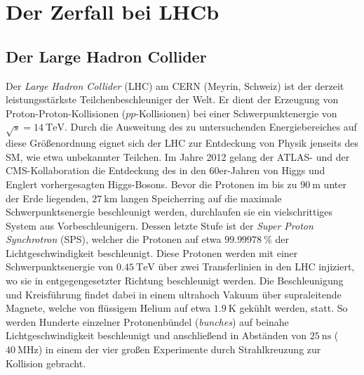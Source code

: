 \chapter{Der Zerfall bei LHCb}
%
\section{Der Large Hadron Collider}
%
Der \textit{Large Hadron Collider} (LHC) am CERN (Meyrin, Schweiz) ist der derzeit leistungsstärkste Teilchenbeschleuniger der Welt. Er dient der Erzeugung von Proton-Proton-Kollisionen ($pp$-Kollisionen) bei einer Schwerpunktenergie von $\sqrt{s}=\SI{14}{\tera\electronvolt}$\cite{lhc}. Durch die Ausweitung des zu untersuchenden Energiebereiches auf diese Größenordnung eignet sich der LHC zur Entdeckung von Physik jenseits des SM, wie etwa unbekannter Teilchen. Im Jahre 2012 gelang der ATLAS- und der CMS-Kollaboration die Entdeckung des in den 60er-Jahren von Higgs und Englert vorhergesagten Higgs-Bosons\cite{higgs}.
Bevor die Protonen im bis zu $\SI{90}{\meter}$ unter der Erde liegenden, $\SI{27}{\kilo\meter}$ langen Speicherring auf die maximale Schwerpunktsenergie beschleunigt werden, durchlaufen sie ein vielschrittiges System aus Vorbeschleunigern. Dessen letzte Stufe ist der \textit{Super Proton Synchrotron} (SPS), welcher die Protonen auf etwa $\SI{99,99978}{\percent}$ der Lichtgeschwindigkeit beschleunigt\cite{lhc}. Diese Protonen werden mit einer Schwerpunktsenergie von $\SI{0,45}{\tera\electronvolt}$ über zwei Transferlinien in den LHC injiziert, wo sie in entgegengesetzter Richtung beschleunigt werden. Die Beschleunigung und Kreisführung findet dabei in einem ultrahoch Vakuum über supraleitende Magnete, welche von flüssigem Helium auf etwa $\SI{1,9}{\kelvin}$ gekühlt werden, statt. So werden Hunderte einzelner Protonenbündel (\textit{bunches}) auf beinahe Lichtgeschwindigkeit beschleunigt und anschließend in Abständen von $\SI{25}{\nano\second}$ ($\SI{40}{\mega\hertz}$) in einem der vier großen Experimente durch Strahlkreuzung zur Kollision gebracht.
%
